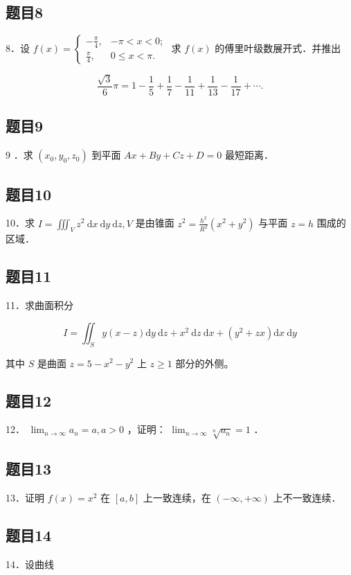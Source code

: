 \documentclass{article}
\begin{document}
\subsection{题目8}
8．设 \(f(x)=\left\{\begin{array}{ll}-\frac{\pi}{4}, & -\pi<x<0 ; \\ \frac{\pi}{4}, & 0 \leq x<\pi .\end{array}\right.\) 求 \(f(x)\) 的傅里叶级数展开式．并推出

\[
\frac{\sqrt{3}}{6} \pi=1-\frac{1}{5}+\frac{1}{7}-\frac{1}{11}+\frac{1}{13}-\frac{1}{17}+\cdots .
\]

\subsection{题目9}
9 ．求 \(\left(x_{0}, y_{0}, z_{0}\right)\) 到平面 \(A x+B y+C z+D=0\) 最短距离．

\subsection{题目10}
10．求 \(I=\iiint_{V} z^{2} \mathrm{~d} x \mathrm{~d} y \mathrm{~d} z, V\) 是由锥面 \(z^{2}=\frac{h^{2}}{R^{2}}\left(x^{2}+y^{2}\right)\) 与平面 \(z=h\) 围成的区域．

\subsection{题目11}
11．求曲面积分

\[
I=\iint_{S} y(x-z) \mathrm{d} y \mathrm{~d} z+x^{2} \mathrm{~d} z \mathrm{~d} x+\left(y^{2}+z x\right) \mathrm{d} x \mathrm{~d} y
\]

其中 \(S\) 是曲面 \(z=5-x^{2}-y^{2}\) 上 \(z \geq 1\) 部分的外侧。

\subsection{题目12}
12． \(\lim _{n \rightarrow \infty} a_{n}=a, a>0\) ，证明： \(\lim _{n \rightarrow \infty} \sqrt[n]{a_{n}}=1\) ．

\subsection{题目13}
13．证明 \(f(x)=x^{2}\) 在 \([a, b]\) 上一致连续，在 \((-\infty,+\infty)\) 上不一致连续．

\subsection{题目14}
14．设曲线
\end{document}
